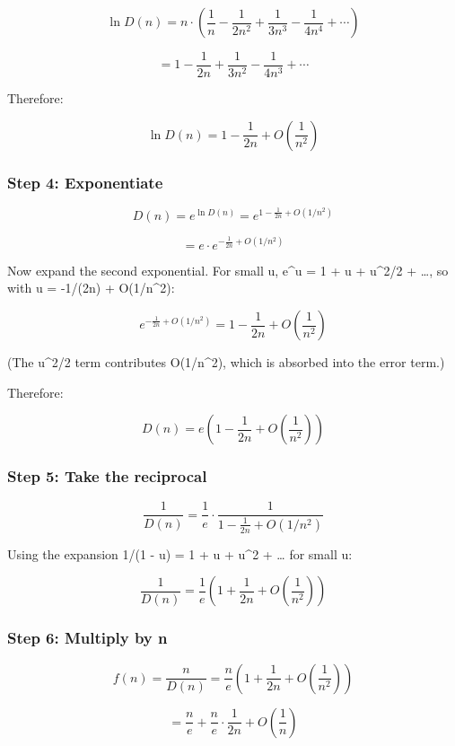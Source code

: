 \documentclass[
]{article}
\begin{document}
\[\ln D(n) = n \cdot \left(\frac{1}{n} - \frac{1}{2n^2} + \frac{1}{3n^3} - \frac{1}{4n^4} + \cdots\right)\]

\[= 1 - \frac{1}{2n} + \frac{1}{3n^2} - \frac{1}{4n^3} + \cdots\]

Therefore:

\[\ln D(n) = 1 - \frac{1}{2n} + O\!\left(\frac{1}{n^2}\right)\]

\subsubsection{Step 4: Exponentiate}\label{step-4-exponentiate}

\[D(n) = e^{\ln D(n)} = e^{1 - \frac{1}{2n} + O(1/n^2)}\]

\[= e \cdot e^{-\frac{1}{2n} + O(1/n^2)}\]

Now expand the second exponential. For small u, e\^{}u = 1 + u +
u\^{}2/2 + \ldots, so with u = -1/(2n) + O(1/n\^{}2):

\[e^{-\frac{1}{2n} + O(1/n^2)} = 1 - \frac{1}{2n} + O\!\left(\frac{1}{n^2}\right)\]

(The u\^{}2/2 term contributes O(1/n\^{}2), which is absorbed into the
error term.)

Therefore:

\[D(n) = e\left(1 - \frac{1}{2n} + O\!\left(\frac{1}{n^2}\right)\right)\]

\subsubsection{Step 5: Take the
reciprocal}\label{step-5-take-the-reciprocal}

\[\frac{1}{D(n)} = \frac{1}{e} \cdot \frac{1}{1 - \frac{1}{2n} + O(1/n^2)}\]

Using the expansion 1/(1 - u) = 1 + u + u\^{}2 + \ldots{} for small u:

\[\frac{1}{D(n)} = \frac{1}{e}\left(1 + \frac{1}{2n} + O\!\left(\frac{1}{n^2}\right)\right)\]

\subsubsection{Step 6: Multiply by n}\label{step-6-multiply-by-n}

\[f(n) = \frac{n}{D(n)} = \frac{n}{e}\left(1 + \frac{1}{2n} + O\!\left(\frac{1}{n^2}\right)\right)\]

\[= \frac{n}{e} + \frac{n}{e} \cdot \frac{1}{2n} + O\!\left(\frac{1}{n}\right)\]
\end{document}
